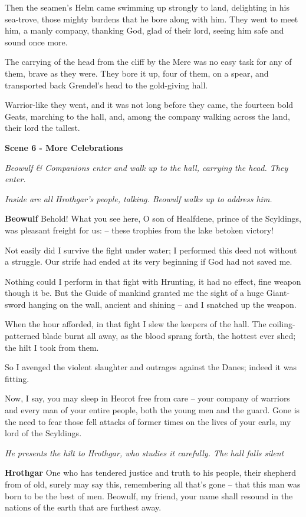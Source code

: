 \documentclass[a4paper]{article}
\begin{document}
{Then the seamen’s Helm came swimming up
strongly to land, delighting in his sea-trove,
those mighty burdens that he bore along with him.
They went to meet him, a manly company,
thanking God, glad of their lord,
seeing him safe and sound once more.

The carrying of the head from the cliff by the Mere
was no easy task for any of them,
brave as they were. They bore it up,
four of them, on a spear, and transported back
Grendel’s head to the gold-giving hall.

Warrior-like they went, and it was not long
before they came, the fourteen bold Geats,
marching to the hall, and, among the company
walking across the land, their lord the tallest.

\centerline{\textbf{Scene 6 - More Celebrations}}

\centerline{\textit{Beowulf \& Companions enter and walk up to the hall, carrying the head. They enter.}}
\centerline{\textit{Inside are all Hrothgar's people, talking. Beowulf walks up to address him.}}

\textbf{Beowulf} Behold! What you see here, O son of Healfdene,
prince of the Scyldings, was pleasant freight for us:
– these trophies from the lake betoken victory!

Not easily did I survive
the fight under water; I performed this deed
not without a struggle. Our strife had ended
at its very beginning if God had not saved me.

Nothing could I perform in that fight with Hrunting,
it had no effect, fine weapon though it be.
But the Guide of mankind granted me the sight
of a huge Giant-sword hanging on the wall,
ancient and shining – and I snatched up the weapon.

When the hour afforded, in that fight I slew
the keepers of the hall. The coiling-patterned
blade burnt all away, as the blood sprang forth,
the hottest ever shed; the hilt I took from them.

So I avenged the violent slaughter
and outrages against the Danes; indeed it was fitting.

Now, I say, you may sleep in Heorot
free from care – your company of warriors
and every man of your entire people,
both the young men and the guard. Gone is the need
to fear those fell attacks of former times
on the lives of your earls, my lord of the Scyldings.

\centerline{\textit{He presents the hilt to Hrothgar, who studies it carefully. The hall falls silent}}

\textbf{Hrothgar} One who has tendered justice and truth to his people,
 their shepherd from of old, surely may say this,
remembering all that’s gone – that this man was born
to be the best of men. Beowulf, my friend,
your name shall resound in the nations of the earth
that are furthest away.

}
\end{document}
